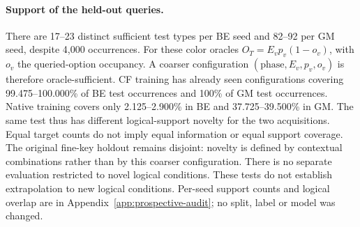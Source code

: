 \paragraph{Support of the held-out queries.}
There are 17--23 distinct sufficient test types per BE seed and 82--92
per GM seed, despite 4,000 occurrences. For these color oracles
$O_T=E_vp_v(1-o_v)$, with $o_v$ the queried-option occupancy. A coarser
configuration $(\text{phase},E_v,p_v,o_v)$ is therefore oracle-sufficient.
CF training has already seen configurations covering 99.475--100.000\% of BE
test occurrences and 100\% of GM test occurrences. Native training covers
only 2.125--2.900\% in BE and 37.725--39.500\% in GM. The same test thus has
different logical-support novelty for the two acquisitions. Equal target
counts do not imply equal information or equal support coverage.
The original fine-key
holdout remains disjoint: novelty is defined by contextual combinations
rather than by this coarser configuration. There is no separate evaluation
restricted to novel logical conditions. These tests do not establish extrapolation to new logical
conditions. Per-seed support counts and logical overlap are in
Appendix~\ref{app:prospective-audit}; no split, label or model was changed.
